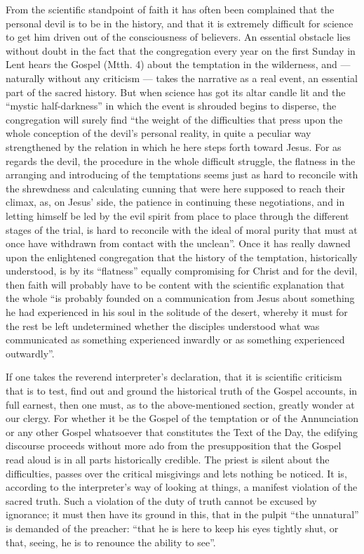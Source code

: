 \documentclass[12pt,a4paper,openany]{book}
\newcommand{\opage}[1]{\marginnote{\footnotesize\textit{[#1]}}}
\begin{document}
From the scientific standpoint of faith it has often been
complained that the personal devil is to be in
the history, and that it is extremely difficult for science
to get him driven out of the consciousness of believers. An
essential obstacle lies without doubt in the fact that the congregation
every year on the first Sunday in Lent hears the Gospel
(Mtth. 4) about the temptation in the wilderness, and --- naturally
without any criticism --- takes the narrative as a real
event, an essential part of the sacred history.
But when science has got its altar candle lit and
the ``mystic half-darkness'' in which the event is shrouded
begins to disperse, the congregation will surely
find ``the weight of the difficulties that press upon the whole
conception of the devil's personal reality, in
quite a peculiar way strengthened by the relation in which
he here steps forth toward Jesus. For as regards the devil,
the procedure in the whole difficult
struggle, the flatness in the arranging and introducing of the temptations
seems just as hard to reconcile with the
shrewdness and calculating cunning that were here supposed to
reach their climax, as, on Jesus' side, the patience
in continuing these negotiations, and in letting himself be led by the evil spirit
from place to place through the different stages
of the trial, is hard to reconcile with the ideal of
\setcounter{footnote}{0}%
\opage{299}moral purity that must at once have withdrawn
from contact with the unclean''. Once it has really
dawned upon the enlightened congregation that the history of the temptation,
historically understood, is by its ``flatness'' equally compromising
for Christ and for the devil, then faith will probably
have to be content with the scientific explanation that
the whole ``is probably founded on a communication
from Jesus about something he had experienced in his soul in the
solitude of the desert, whereby it must for the rest be left
undetermined whether the disciples understood what was communicated
as something experienced inwardly or as something experienced outwardly''.

If one takes the reverend interpreter's
declaration, that it is scientific criticism that is to
test, find out and ground the historical truth of the
Gospel accounts, in full earnest, then one must, as to
the above-mentioned section, greatly wonder at our
clergy. For whether it be the Gospel of the temptation
or of the Annunciation or any other Gospel whatsoever
that constitutes the Text of the Day, the edifying
discourse proceeds without more ado from the presupposition
that the Gospel read aloud is in all parts historically
credible. The priest is silent about the difficulties, passes over
the critical misgivings and lets
nothing be noticed. It is, according to the interpreter's way of looking at things,
a manifest violation of the sacred truth.
Such a violation of the duty of truth cannot be excused
by ignorance; it must then have its ground
in this, that in the pulpit ``the unnatural'' is demanded
of the preacher: ``that he is here to keep his eyes tightly shut, or that, seeing, he is to renounce the ability to
see''.
\end{document}

